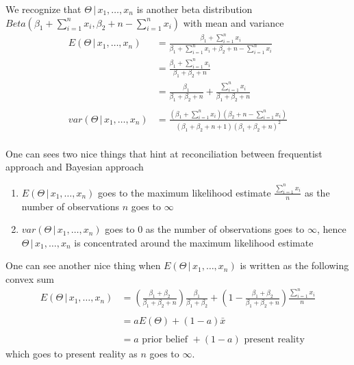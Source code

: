 \documentclass[14pt, reqno]{amsart}
\theoremstyle{definition}
\begin{document}
We recognize that $\Theta \,|\, x_1, \dots, x_n$ is another beta distribution $Beta(\beta_1 + \sum \limits _{i=1}^n x_i, \beta_2  + n - \sum \limits _{i=1}^n x_i)$ with mean and variance
\vspace{10pt}
\begin{align*}
E(\Theta \,|\, x_1, \dots, x_n) & =  \frac{\beta_1 + \sum \limits _{i=1}^n x_i}{\beta_1 + \sum \limits _{i=1}^n x_i + \beta_2 + n - \sum \limits _{i=1}^n x_i} \\
 & = \frac{\beta_1 + \sum \limits _{i=1}^n x_i}{\beta_1 + \beta_2 + n} \\
 & = \frac{\beta_1}{\beta_1 + \beta_2 + n} + \frac{\sum \limits _{i=1}^n x_i}{\beta_1 + \beta_2 + n} \\
\\
var(\Theta \,|\, x_1, \dots, x_n) & = \frac{(\beta_1 + \sum \limits _{i=1}^n x_i)(\beta_2 + n - \sum \limits _{i=1}^n x_i)}{(\beta_1 + \beta_2 + n + 1)(\beta_1 + \beta_2 + n)^2} \\
\end{align*}
\vfill
\pagebreak

One can sees two nice things that hint at reconciliation between frequentist approach and Bayesian approach
\begin{enumerate}[1.]
\item $E(\Theta \,|\, x_1, \dots, x_n)$ goes to the maximum likelihood estimate $\frac{\sum \limits _{i=1}^n x_i}{n}$ as the number of observations $n$ goes to $\infty$
\item $var(\Theta \,|\, x_1, \dots, x_n)$ goes to 0 as the number of observations goes to $\infty$, hence $\Theta \,|\, x_1, \dots, x_n$ is concentrated around the maximum likelihood estimate
\end{enumerate}
\vfill
\pagebreak

One can see another nice thing when $E(\Theta \,|\, x_1, \dots, x_n)$ is written as the following convex sum
\vspace{10pt}
\begin{align*}
E(\Theta \,|\, x_1, \dots, x_n) & = \left( \frac{\beta_1 + \beta_2}{\beta_1 + \beta_2 + n} \right) \frac{\beta_1}{\beta_1 + \beta_2} + \left( 1 - \frac{\beta_1 + \beta_2}{\beta_1 + \beta_2 + n} \right) \frac{\sum \limits _{i=1}^n x_i}{n} \\
\\
 & = a E(\Theta) + (1 - a) \bar{x} \\
\\
 & =  a \text{ prior belief } + (1 - a)\text{ present reality}
\end{align*}
which goes to present reality as $n$ goes to $\infty$.
\vfill
\pagebreak
\end{document}
